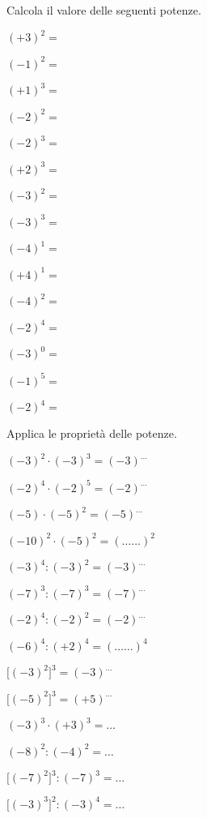 \begin{esercizio}
\label{ese:2.22}
Calcola il valore delle seguenti potenze.
\begin{multicols}{3}
 \begin{enumeratea}
 \item $(+3)^2 =$
 \item $(-1)^2 =$
 \item $(+1)^3 =$
 \item $(-2)^2 =$
 \item $(-2)^3 =$
 \item $(+2)^3 =$
 \item $(-3)^2 =$
 \item $(-3)^3 =$
 \item $(-4)^1 =$
 \item $(+4)^1 =$
 \item $(-4)^2 =$
 \item $(-2)^4 =$
 \item $(-3)^0 =$
 \item $(-1)^5 =$
 \item $(-2)^4 =$
 \end{enumeratea}
 \end{multicols}
\end{esercizio}

\begin{esercizio}
\label{ese:2.23}
 Applica le proprietà delle potenze.
\begin{multicols}{2}
 \begin{enumeratea}
 \item $(-3)^2\cdot(-3)^3 = (-3)^{\ldots}$
 \item $(-2)^4\cdot(-2)^5 = (-2)^{\ldots}$
 \item $(-5)\cdot(-5)^2 = (-5)^{\ldots}$
 \item $(-10)^2\cdot(-5)^2 = (\ldots \ldots)^2$
 \item $(-3)^4:(-3)^2 = (-3)^{\ldots}$
 \item $(-7)^3:(-7)^3=(-7)^{\ldots}$
 \item $(-2)^4:(-2)^2=(-2)^{\ldots}$
 \item $(-6)^4:(+2)^4=(\ldots \ldots)^4$
 \item $\big[(-3)^2\big]^3 = (-3)^{\ldots}$
 \item $\big[(-5)^2\big]^3=(+5)^{\ldots}$
 \item $(-3)^3\cdot(+3)^3 = \ldots$
 \item $(-8)^2:(-4)^2= \ldots$
 \item $\big[(-7)^2\big]^3: (-7)^3 =\ldots$
 \item $\big[(-3)^3\big]^2: (-3)^4=\ldots$
 \end{enumeratea}
 \end{multicols}
\end{esercizio}



